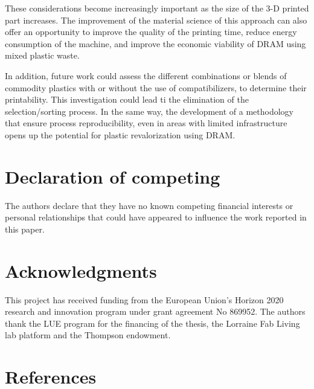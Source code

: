 \documentclass[
  letterpaper,
  DIV=11,
  numbers=noendperiod]{scrartcl}
\begin{document}
These considerations become increasingly important as the size of the
3-D printed part increases. The improvement of the material science of
this approach can also offer an opportunity to improve the quality of
the printing time, reduce energy consumption of the machine, and improve
the economic viability of DRAM using mixed plastic waste.

In addition, future work could assess the different combinations or
blends of commodity plastics with or without the use of compatibilizers,
to determine their printability. This investigation could lead ti the
elimination of the selection/sorting process. In the same way, the
development of a methodology that ensure process reproducibility, even
in areas with limited infrastructure opens up the potential for plastic
revalorization using DRAM.

\hypertarget{declaration-of-competing}{%
\section*{Declaration of competing}\label{declaration-of-competing}}

The authors declare that they have no known competing financial
interests or personal relationships that could have appeared to
influence the work reported in this paper.

\hypertarget{acknowledgments}{%
\section*{Acknowledgments}\label{acknowledgments}}

This project has received funding from the European Union's Horizon 2020
research and innovation program under grant agreement No 869952. The
authors thank the LUE program for the financing of the thesis, the
Lorraine Fab Living lab platform and the Thompson endowment.

\newpage

\hypertarget{references}{%
\section*{References}\label{references}}

\end{document}
